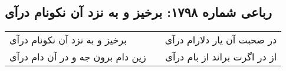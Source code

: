 \begin{center}
\section*{رباعی شماره ۱۷۹۸: برخیز و به نزد آن نکونام درآی}
\label{sec:1798}
\begin{longtable}{l p{0.5cm} r}
برخیز و به نزد آن نکونام درآی
&&
در صحبت آن یار دلارام درآی
\\
زین دام برون جه و در آن دام درآی
&&
از در اگرت براند از بام درآی
\\
\end{longtable}
\end{center}
